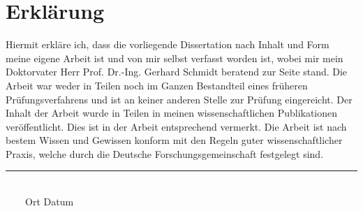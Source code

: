 \chapter*{Erklärung}

\vspace{3cm}
Hiermit erkläre ich, dass die vorliegende Dissertation nach Inhalt und Form meine eigene Arbeit ist und von mir selbst verfasst worden ist, wobei mir mein Doktorvater Herr Prof. Dr.-Ing. Gerhard Schmidt beratend zur Seite stand. Die Arbeit war weder in Teilen noch im Ganzen Bestandteil eines früheren Prüfungsverfahrens und ist an keiner anderen Stelle zur Prüfung eingereicht. Der Inhalt der Arbeit wurde in Teilen in meinen wissenschaftlichen Publikationen veröffentlicht. Dies ist in der Arbeit entsprechend vermerkt. Die Arbeit ist nach bestem Wissen und Gewissen konform mit den Regeln guter wissenschaftlicher Praxis, welche durch die Deutsche Forschungsgemeinschaft festgelegt sind.  
\vspace{3cm}

\noindent\rule{0.75\textwidth}{.5pt}\\
\mbox{\quad \ \ \ \ Ort} \hspace{2cm} Datum \hspace{2cm} \ath{}\\
